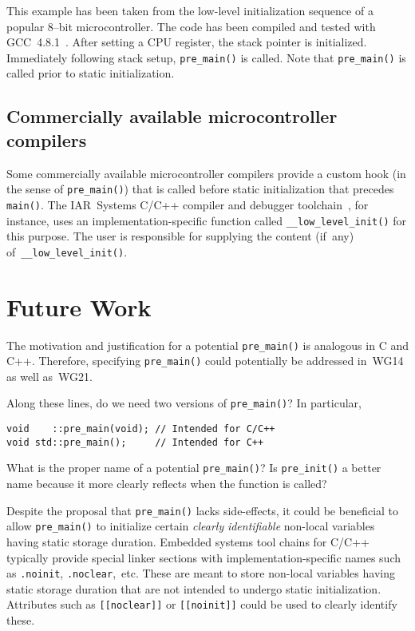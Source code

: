 \documentclass[11pt]{article}
\begin{document}
This example has been taken from the low-level
initialization sequence of a popular 8--bit microcontroller.
The code has been compiled and tested with GCC~4.8.1~\cite{bib:gccwebsite}.
After setting a CPU register, the stack pointer is initialized.
Immediately following stack setup, \lstinline{pre_main()} is called.
Note that \lstinline{pre_main()} is called prior to
static initialization.

\subsection*{Commercially available microcontroller compilers}

Some commercially available microcontroller compilers provide
a custom hook (in the sense of \lstinline{pre_main()}) that
is called before static initialization that precedes \lstinline{main()}.
The IAR~Systems C/C++ compiler and debugger toolchain~\cite{bib:iar2015},
for instance, uses an implementation-specific function
called \lstinline{__low_level_init()} for this purpose.
The user is responsible for supplying the content (if~any)
of~\lstinline{__low_level_init()}.

\section{Future Work}

The motivation and justification for a potential \lstinline{pre_main()}
is analogous in C and C++. Therefore, specifying \lstinline{pre_main()}
could potentially be addressed in~WG14 as well as~WG21.

Along these lines, do we need two versions of \lstinline{pre_main()}?
In particular,

\begin{lstlisting}
void    ::pre_main(void); // Intended for C/C++
void std::pre_main();     // Intended for C++
\end{lstlisting}

What is the proper name of a potential \lstinline{pre_main()}?
Is \lstinline{pre_init()} a better name because it
more clearly reflects when the function is called?

Despite the proposal that \lstinline{pre_main()} lacks side-effects,
it could be beneficial to allow \lstinline{pre_main()} to initialize certain
\emph{clearly} \emph{identifiable} non-local variables
having static storage duration.
Embedded systems tool chains for C/C++ typically provide special
linker sections with implementation-specific names such as
\lstinline{.noinit}, \lstinline{.noclear},~etc. These are meant
to store non-local variables having static storage duration that are not
intended to undergo static initialization.
Attributes such as \lstinline{[[noclear]]} or \lstinline{[[noinit]]}
could be used to clearly identify these.
\end{document}
